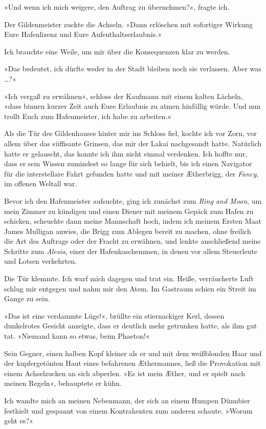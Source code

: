 »Und wenn ich mich weigere, den Auftrag zu übernehmen?«, fragte
ich.

Der Gildenmeister zuckte die Achseln. »Dann erlöschen mit
sofortiger Wirkung Eure Hafenlizenz und Eure
Aufenthaltserlaubnis.«

Ich brauchte eine Weile, um mir über die Konsequenzen klar zu
werden.

»Das bedeutet, ich dürfte weder in der Stadt bleiben noch sie
verlassen. Aber was \ldots{}?«

»Ich vergaß zu erwähnen«, schloss der Kaufmann mit einem kalten
Lächeln, »dass binnen kurzer Zeit auch Eure Erlaubnis zu atmen
hinfällig würde. Und nun trollt Euch zum Hafenmeister, ich habe zu
arbeiten.«

\bigpar

Als die Tür des Gildenhauses hinter mir ins Schloss fiel, kochte
ich vor Zorn, vor allem über das süffisante Grinsen, das mir der
Lakai nachgesandt hatte. Natürlich hatte er gelauscht, das konnte
ich ihm nicht einmal verdenken. Ich hoffte nur, dass er sein Wissen
zumindest so lange für sich behielt, bis ich einen Navigator für
die interstellare Fahrt gefunden hatte und mit meiner Ætherbrigg,
der \emph{Fancy}, im offenen Weltall war.

Bevor ich den Hafenmeister aufsuchte, ging ich zunächst zum
\emph{Ring and Moon}, um mein Zimmer zu kündigen und einen Diener
mit meinem Gepäck zum Hafen zu schicken, scheuchte dann meine
Mannschaft hoch, indem ich meinem Ersten Maat James Mulligan
anwies, die Brigg zum Ablegen bereit zu machen, ohne freilich die
Art des Auftrags oder der Fracht zu erwähnen, und lenkte
anschließend meine Schritte zum \emph{Alesia}, einer der
Hafenkaschemmen, in denen vor allem Steuerleute und Lotsen
verkehrten.

Die Tür klemmte. Ich warf mich dagegen und trat ein. Heiße,
verräucherte Luft schlug mir entgegen und nahm mir den Atem. Im
Gastraum schien ein Streit im Gange zu sein.

»Das ist eine verdammte Lüge!«, brüllte ein stiernackiger Kerl,
dessen dunkelrotes Gesicht anzeigte, dass er deutlich mehr
getrunken hatte, als ihm gut tat. »Niemand kann so etwas, beim
Phaeton!«

Sein Gegner, einen halben Kopf kleiner als er und mit dem
weißblonden Haar und der kupfergetönten Haut eines befahrenen
Æthermannes, ließ die Provokation mit einem Achselzucken an sich
abperlen. »Es ist mein Æther, und er spielt nach meinen Regeln«,
behauptete er kühn.

Ich wandte mich an meinen Nebenmann, der sich an einem Humpen
Dünnbier festhielt und gespannt von einem Kontrahenten zum anderen
schaute. »Worum geht es?«

